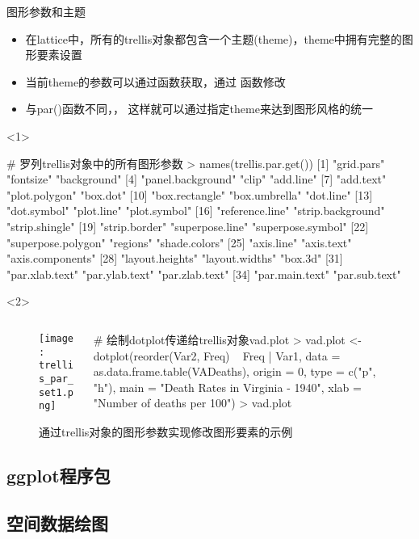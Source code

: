 \begin{frame}[t,fragile]{\subsecname}{图形参数和主题}
\begin{itemize}
\item 在lattice中，所有的trellis对象都包含一个主题(theme)，theme中拥有完整的图形要素设置
\item 当前theme的参数可以通过函数获取，通过
函数修改
\item 与par()函数不同，，
这样就可以通过指定theme来达到图形风格的统一
\end{itemize}

\begin{overlayarea}{\textwidth}{\textheight}
\begin{onlyenv}<1>
\begin{rcode}
# 罗列trellis对象中的所有图形参数
> names(trellis.par.get())
 [1] "grid.pars"         "fontsize"          "background"       
 [4] "panel.background"  "clip"              "add.line"         
 [7] "add.text"          "plot.polygon"      "box.dot"          
[10] "box.rectangle"     "box.umbrella"      "dot.line"         
[13] "dot.symbol"        "plot.line"         "plot.symbol"      
[16] "reference.line"    "strip.background"  "strip.shingle"    
[19] "strip.border"      "superpose.line"    "superpose.symbol" 
[22] "superpose.polygon" "regions"           "shade.colors"     
[25] "axis.line"         "axis.text"         "axis.components"  
[28] "layout.heights"    "layout.widths"     "box.3d"           
[31] "par.xlab.text"     "par.ylab.text"     "par.zlab.text"    
[34] "par.main.text"     "par.sub.text"    
\end{rcode}
\end{onlyenv}

\begin{onlyenv}<2>
\begin{figure}
 \begin{columns}
    \begin{column}[c]{.5\textwidth}
        \texttt{[image: trellis\_par\_set1.png]}
    \end{column}

    \begin{column}[c]{.5\textwidth}
\begin{rcode}
# 绘制dotplot传递给trellis对象vad.plot
> vad.plot <- 
    dotplot(reorder(Var2, Freq) ~ Freq | Var1,
            data = as.data.frame.table(VADeaths), 
            origin = 0, type = c("p", "h"),
            main = "Death Rates in Virginia - 1940", 
            xlab = "Number of deaths per 100")
> vad.plot
\end{rcode}
    \end{column}
  \end{columns}
  \caption{通过trellis对象的图形参数实现修改图形要素的示例}
\end{figure}
\end{onlyenv}
\end{overlayarea}
\end{frame}
\subsection{ggplot程序包}

\subsection{空间数据绘图}
